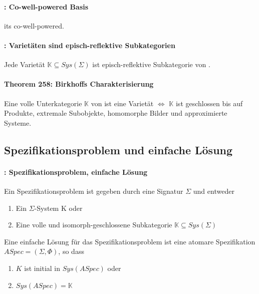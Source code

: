 \paragraph{: Co-well-powered Basis} 
\syssig its co-well-powered.


\paragraph{: Varietäten sind episch-reflektive Subkategorien}
Jede Varietät $\mathbb{K} \subseteq Sys(\Sigma)$ ist episch-reflektive Subkategorie von \syssig.

\paragraph{Theorem 258: Birkhoffs Charakterisierung}
Eine volle Unterkategorie $\mathbb{K}$ von \syssig ist eine Varietät $\Leftrightarrow $ $\mathbb{K}$ ist geschlossen bis auf Produkte, extremale Subobjekte, homomorphe Bilder und approximierte Systeme. 
 
 
\newpage  
\subsection{Spezifikationsproblem und einfache Lösung}

\paragraph{: Spezifikationsproblem, einfache Lösung}
Ein Spezifikationsproblem ist gegeben durch eine Signatur $\Sigma$ und entweder 
\begin{enumerate}
\item Ein $\Sigma$-System K oder
\item Eine volle und isomorph-geschlossene Subkategorie $\mathbb{K} \subseteq Sys(\Sigma)$ 
\end{enumerate}
Eine einfache Lösung für das Spezifikationsproblem ist eine atomare Spezifikation $ASpec = (\Sigma, \Phi)$, so dass 
\begin{enumerate}
\item $K$ ist initial in $Sys(ASpec)$ oder
\item $Sys(ASpec) = \mathbb{K}$
\end{enumerate}

















